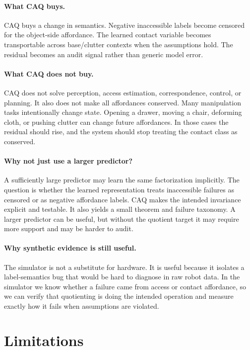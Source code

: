 \documentclass{article}
\begin{document}
\paragraph{What CAQ buys.}
CAQ buys a change in semantics. Negative inaccessible labels become censored for the object-side affordance. The learned contact variable becomes transportable across base/clutter contexts when the assumptions hold. The residual becomes an audit signal rather than generic model error.

\paragraph{What CAQ does not buy.}
CAQ does not solve perception, access estimation, correspondence, control, or planning. It also does not make all affordances conserved. Many manipulation tasks intentionally change state. Opening a drawer, moving a chair, deforming cloth, or pushing clutter can change future affordances. In those cases the residual should rise, and the system should stop treating the contact class as conserved.

\paragraph{Why not just use a larger predictor?}
A sufficiently large predictor may learn the same factorization implicitly. The question is whether the learned representation treats inaccessible failures as censored or as negative affordance labels. CAQ makes the intended invariance explicit and testable. It also yields a small theorem and failure taxonomy. A larger predictor can be useful, but without the quotient target it may require more support and may be harder to audit.

\paragraph{Why synthetic evidence is still useful.}
The simulator is not a substitute for hardware. It is useful because it isolates a label-semantics bug that would be hard to diagnose in raw robot data. In the simulator we know whether a failure came from access or contact affordance, so we can verify that quotienting is doing the intended operation and measure exactly how it fails when assumptions are violated.

\section{Limitations}
\end{document}
